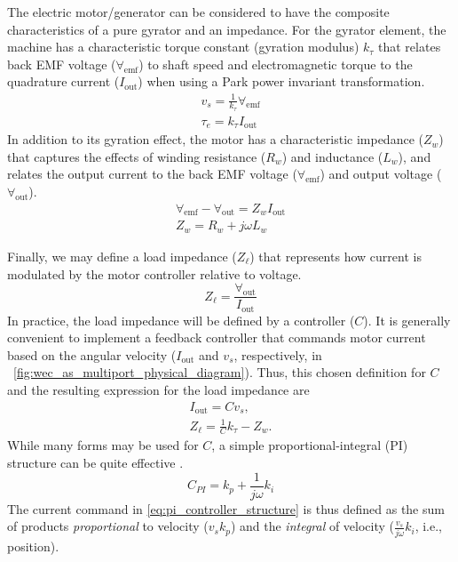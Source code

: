 \documentclass[5p,times]{elsarticle}
\begin{document}
The electric motor/generator can be considered to have the composite characteristics of a pure gyrator and an impedance.
For the gyrator element, the machine has a characteristic torque constant (gyration modulus) $k_\tau$ that relates back EMF voltage ($\forall_{\textrm{emf}}$) to shaft speed and electromagnetic torque to the quadrature current ($I_{\textrm{out}}$) when using a Park power invariant transformation.
%
\begin{subequations}
        \begin{gather}
                v_s = \frac{1}{k_\tau}\forall_{\textrm{emf}} \\
                \tau_e = k_\tau I_{\textrm{out}}
        \end{gather}
\end{subequations}
%
In addition to its gyration effect, the motor has a characteristic impedance ($Z_w$) that captures the effects of winding resistance ($R_w$) and inductance ($L_w$), and relates the output current to the back EMF voltage ($\forall_{\textrm{emf}}$) and output voltage ($\forall_{\textrm{out}}$).
%
\begin{subequations}
        \begin{gather}
                \forall_{\textrm{emf}} - \forall_{\textrm{out}} = Z_w I_{\textrm{out}}\\
                Z_w = R_w + j \omega L_w \label{eq:winding_impedance}
        \end{gather}
\end{subequations}

Finally, we may define a load impedance ($Z_\ell$) that represents how current is modulated by the motor controller relative to voltage.
%
\begin{equation}
        Z_\ell = \frac{\forall_{\textrm{out}}}{I_{\textrm{out}}}
        \label{eq:load_impedance}
\end{equation}
%
In practice, the load impedance will be defined by a controller ($C$).
It is generally convenient to implement a feedback controller that commands motor current based on the angular velocity ($I_{\textrm{out}}$ and $v_s$, respectively, in \figurename~\ref{fig:wec_as_multiport_physical_diagram}).
Thus, this chosen definition for $C$ and the resulting expression for the load impedance are
%
\begin{subequations}
\begin{gather}
        I_{\textrm{out}} = C v_s , \\  
        Z_\ell = \frac{1}{C} k_\tau - Z_w .
\end{gather}
\end{subequations}
%
While many forms may be used for $C$, a simple proportional-integral (PI) structure can be quite effective \cite{Coe2020a}.
%
\begin{equation}
        C_{PI} = k_p + \frac{1}{j \omega} k_i 
        \label{eq:pi_controller_structure}
\end{equation}
%
The current command in \eqref{eq:pi_controller_structure} is thus defined as the sum of products \emph{proportional} to velocity ($v_s k_p$) and the \emph{integral} of velocity ($\frac{v_s}{j \omega} k_i$, i.e., position).
\end{document}
